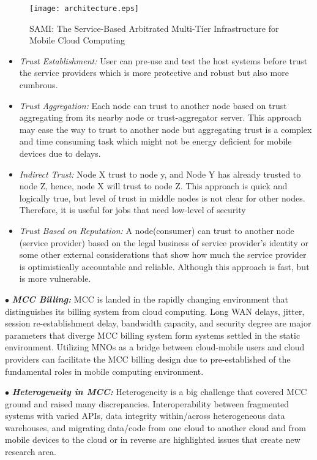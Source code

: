 \documentclass[conference]{IEEEtran}
\begin{document}
\begin{figure*}[!ht]
\begin{center}
\texttt{[image: architecture.eps]} 
\caption{SAMI: The Service-Based Arbitrated Multi-Tier Infrastructure for Mobile Cloud Computing} \label{architecture}
\end{center}
\end{figure*}
\begin{itemize}


\item \textit{Trust Establishment:} User can pre-use and test the host systems before trust the service providers which is more protective and robust but also more cumbrous. 

\item \textit{Trust Aggregation:} Each node can trust to another node based on trust aggregating from its nearby node or trust-aggregator server. This approach may ease the way to trust to another node but aggregating trust is a complex and time consuming task which might not be energy deficient for mobile devices due to delays.  

\item  \textit{Indirect Trust:} Node X trust to node y, and Node Y has already trusted to node Z, hence, node X will trust to node Z. This approach is quick and logically true, but level of trust in middle nodes is not clear for other nodes. Therefore, it is useful for jobs that need low-level of security 

\item \textit{Trust Based on Reputation:} A node(consumer) can trust to another node (service provider) based on the legal business of service provider's identity or some other external considerations that show how much the service provider is optimistically accountable and reliable. Although this approach is fast, but is more vulnerable. 
\end{itemize}
\indent $\bullet$ \textit{\textbf{MCC Billing:}} MCC is landed in the rapidly changing environment that distinguishes its billing system from cloud computing. Long WAN delays, jitter, session re-establishment delay, bandwidth capacity, and security degree are major parameters that diverge MCC billing system form systems settled in the static environment. Utilizing MNOs as a bridge between cloud-mobile users and cloud providers can facilitate the MCC billing design due to pre-established of the fundamental roles in mobile computing environment. 

\indent $\bullet$ \textit{\textbf{Heterogeneity in MCC:}} Heterogeneity is a big challenge that covered MCC ground and raised many discrepancies. Interoperability between fragmented systems with varied APIs, data integrity within/across heterogeneous data warehouses, and migrating data/code from one cloud to another cloud and from mobile devices to the cloud or in reverse are highlighted issues that create new research area.
\end{document}
